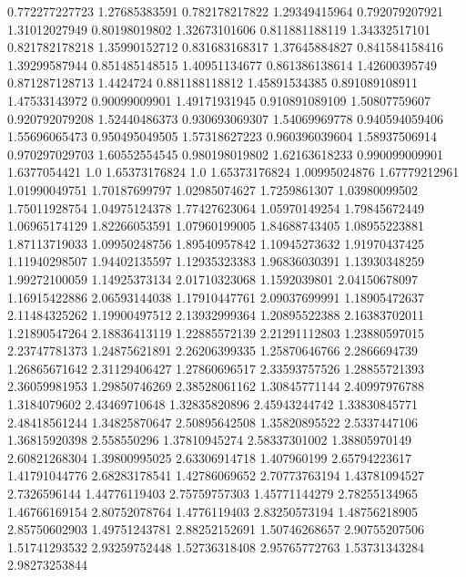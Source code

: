  0.772277227723    1.27685383591
 0.782178217822    1.29349415964
 0.792079207921    1.31012027949
  0.80198019802    1.32673101606
 0.811881188119    1.34332517101
 0.821782178218    1.35990152712
 0.831683168317    1.37645884827
 0.841584158416    1.39299587944
 0.851485148515    1.40951134677
 0.861386138614    1.42600395749
 0.871287128713        1.4424724
 0.881188118812    1.45891534385
 0.891089108911    1.47533143972
  0.90099009901    1.49171931945
 0.910891089109    1.50807759607
 0.920792079208    1.52440486373
 0.930693069307    1.54069969778
 0.940594059406    1.55696065473
 0.950495049505    1.57318627223
 0.960396039604    1.58937506914
 0.970297029703    1.60552554545
 0.980198019802    1.62163618233
 0.990099009901     1.6377054421
            1.0    1.65373176824
            1.0    1.65373176824
  1.00995024876    1.67779212961
  1.01990049751    1.70187699797
  1.02985074627     1.7259861307
  1.03980099502    1.75011928754
  1.04975124378    1.77427623064
  1.05970149254    1.79845672449
  1.06965174129    1.82266053591
  1.07960199005    1.84688743405
  1.08955223881    1.87113719033
  1.09950248756    1.89540957842
  1.10945273632    1.91970437425
  1.11940298507    1.94402135597
  1.12935323383    1.96836030391
  1.13930348259    1.99272100059
  1.14925373134    2.01710323068
   1.1592039801    2.04150678097
  1.16915422886    2.06593144038
  1.17910447761    2.09037699991
  1.18905472637    2.11484325262
  1.19900497512    2.13932999364
  1.20895522388    2.16383702011
  1.21890547264    2.18836413119
  1.22885572139    2.21291112803
  1.23880597015    2.23747781373
  1.24875621891    2.26206399335
  1.25870646766     2.2866694739
  1.26865671642    2.31129406427
  1.27860696517    2.33593757526
  1.28855721393    2.36059981953
  1.29850746269    2.38528061162
  1.30845771144    2.40997976788
   1.3184079602    2.43469710648
  1.32835820896    2.45943244742
  1.33830845771    2.48418561244
  1.34825870647    2.50895642508
  1.35820895522     2.5337447106
  1.36815920398      2.558550296
  1.37810945274    2.58337301002
  1.38805970149    2.60821268304
  1.39800995025    2.63306914718
    1.407960199    2.65794223617
  1.41791044776    2.68283178541
  1.42786069652    2.70773763194
  1.43781094527     2.7326596144
  1.44776119403    2.75759757303
  1.45771144279    2.78255134965
  1.46766169154    2.80752078764
   1.4776119403    2.83250573194
  1.48756218905    2.85750602903
  1.49751243781    2.88252152691
  1.50746268657    2.90755207506
  1.51741293532    2.93259752448
  1.52736318408    2.95765772763
  1.53731343284    2.98273253844

